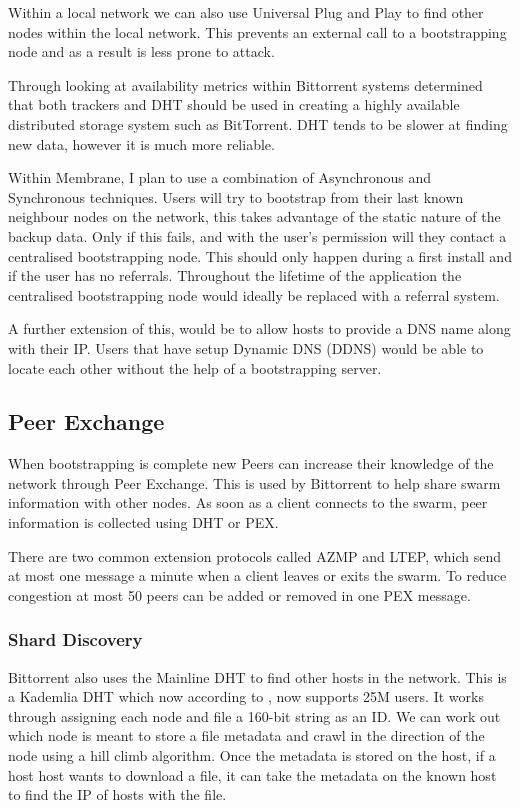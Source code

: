 \documentclass[a4paper,11pt, twocolumn]{report}
\begin{document}
Within a local network we can also use Universal Plug and Play to find other nodes within the local network. This prevents an external call to a bootstrapping node and as a result is less prone to attack.

Through looking at availability metrics within Bittorrent systems \cite{neglia2007availability} determined that both trackers and DHT should be used in creating a highly available distributed storage system such as BitTorrent. DHT tends to be slower at finding new data, however it is much more reliable.

Within Membrane, I plan to use a combination of Asynchronous and Synchronous techniques. Users will try to bootstrap from their last known neighbour nodes on the network, this takes advantage of the static nature of the backup data. Only if this fails, and with the user's permission will they contact a centralised bootstrapping node. This should only happen during a first install and if the user has no referrals. Throughout the lifetime of the application the centralised bootstrapping node would ideally be replaced with a referral system.

A further extension of this, would be to allow hosts to provide a DNS name along with their IP. Users that have setup Dynamic DNS (DDNS) \citep{bound1997dynamic} would be able to locate each other without the help of a bootstrapping server.

\subsection{Peer Exchange}

When bootstrapping is complete new Peers can increase their knowledge of the network through Peer Exchange. This is used by Bittorrent to help share swarm information with other nodes. As soon as a client connects to the swarm, peer information is collected using DHT or PEX.

There are two common extension protocols called AZMP and LTEP, which send at most one message a minute when a client leaves or exits the swarm. To reduce congestion at most 50 peers can be added or removed in one PEX message. \citep{vuze2010vuze}

\subsubsection{Shard Discovery}

Bittorrent also uses the Mainline DHT to find other hosts in the network. This is a Kademlia DHT which now according to \cite{jones2015mainlinedht}, now supports 25M users. It works through assigning each node and file a 160-bit string as an ID. We can work out which node is meant to store a file metadata and crawl in the direction of the node using a hill climb algorithm. Once the metadata is stored on the host, if a host host wants to download a file, it can take the metadata on the known host to find the IP of hosts with the file.
\end{document}
